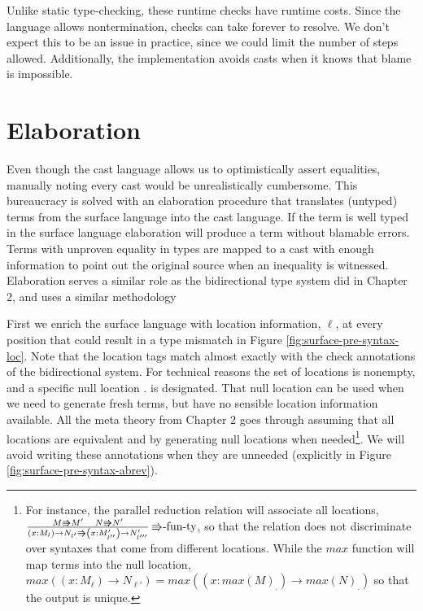 Unlike static type-checking, these runtime checks have runtime costs.
Since the language allows nontermination, checks can take forever
to resolve. We don't expect this to be an issue in practice, since
we could limit the number of steps allowed. Additionally, the implementation
avoids casts when it knows that blame is impossible. 

\section{Elaboration}

Even though the cast language allows us to optimistically assert equalities,
manually noting every cast would be unrealistically cumbersome. This
bureaucracy is solved with an elaboration procedure that translates
(untyped) terms from the surface language into the cast language.
If the term is well typed in the surface language elaboration will
produce a term without blamable errors. Terms with unproven equality
in types are mapped to a cast with enough information to point out
the original source when an inequality is witnessed. Elaboration serves
a similar role as the bidirectional type system did in Chapter 2,
and uses a similar methodology

First we enrich the surface language with location information, $\ell$,
at every position that could result in a type mismatch in Figure \ref{fig:surface-pre-syntax-loc}.
Note that the location tags match almost exactly
with the check annotations of the bidirectional system. For technical
reasons the set of locations is nonempty, and a specific null location
$.$ is designated. That null location can
be used when we need to generate fresh terms, but have no sensible
location information available. All the meta theory from Chapter 2
goes through assuming that all locations are equivalent and by generating
null locations when needed\footnote{For instance, the parallel reduction relation will associate all locations,
$\frac{M\Rrightarrow M'\quad N\Rrightarrow N'}{\left(x:M_{l}\right)\rightarrow N_{l'}\Rrightarrow\left(x:M'_{l''}\right)\rightarrow N'_{l'''}}\,\textrm{\ensuremath{\Rrightarrow}-fun-ty}$,
so that the relation does not discriminate over syntaxes that come
from different locations. While the $max$ function will map terms
into the null location, $max\left(\left(x:M_{\ensuremath{\ell}}\right)\rightarrow N_{\ensuremath{\ell'}}\right)=max\left(\left(x:max\left(M\right)_{.}\right)\rightarrow max\left(N\right)_{.}\right)$
so that the output is unique.}. We will avoid writing these annotations when
they are unneeded (explicitly in Figure \ref{fig:surface-pre-syntax-abrev}).

